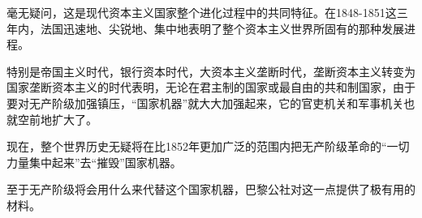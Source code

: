 毫无疑问，这是现代资本主义国家整个进化过程中的共同特征。在1848-1851这三年内，法国迅速地、尖锐地、集中地表明了整个资本主义世界所固有的那种发展进程。

特别是帝国主义时代，银行资本时代，大资本主义垄断时代，垄断资本主义转变为国家垄断资本主义的时代表明，无论在君主制的国家或最自由的共和制国家，由于要对无产阶级加强镇压，“国家机器”就大大加强起来，它的官吏机关和军事机关也就空前地扩大了。

现在，整个世界历史无疑将在比1852年更加广泛的范围内把无产阶级革命的“一切力量集中起来”去“摧毁”国家机器。

至于无产阶级将会用什么来代替这个国家机器，巴黎公社对这一点提供了极有用的材料。








